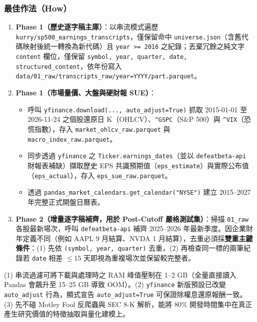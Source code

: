 \documentclass[11pt, a4paper]{article}
\begin{document}
\subsubsection{最佳作法（How）}
\begin{enumerate}[leftmargin=1.5em, itemsep=2pt]
    \item \textbf{Phase 1（歷史逐字稿主庫）}：以串流模式遍歷 \texttt{kurry/sp500\_earnings\_transcripts}，僅保留命中 \texttt{universe.json}（含舊代碼映射後統一轉換為新代碼）且 \texttt{year >= 2016} 之紀錄；丟棄冗餘之純文字 \texttt{content} 欄位，僅保留 \texttt{symbol, year, quarter, date, structured\_content}，依年份寫入 \texttt{data/01\_raw/transcripts\_raw/year=YYYY/part.parquet}。
    \item \textbf{Phase 1（市場量價、大盤與硬財報 SUE）}：
    \begin{itemize}[leftmargin=1.2em]
        \item 呼叫 \texttt{yfinance.download(..., auto\_adjust=True)} 抓取 2015-01-01 至 2026-11-24 之個股還原日 K（OHLCV）、\texttt{\^{}GSPC}（S\&P 500）與 \texttt{\^{}VIX}（恐慌指數），存入 \texttt{market\_ohlcv\_raw.parquet} 與 \texttt{macro\_index\_raw.parquet}。
        \item 同步透過 \texttt{yfinance} 之 \texttt{Ticker.earnings\_dates}（並以 \texttt{defeatbeta-api} 財報表補缺）擷取歷史 EPS 共識預期值（\texttt{eps\_estimate}）與實際公布值（\texttt{eps\_actual}），存入 \texttt{eps\_sue\_raw.parquet}。
        \item 透過 \texttt{pandas\_market\_calendars.get\_calendar("NYSE")} 建立 2015--2027 年完整正式開盤日曆表。
    \end{itemize}
    \item \textbf{Phase 2（增量逐字稿補齊，用於 Post-Cutoff 嚴格測試集）}：掃描 \texttt{01\_raw} 各股最新場次，呼叫 \texttt{defeatbeta-api} 補齊 2025--2026 年最新季度。因企業財年定義不同（例如 AAPL 9 月結算、NVDA 1 月結算），去重必須採\textbf{雙重主鍵條件}：(1) 先依 \texttt{(symbol, year, quarter)} 去重，(2) 再檢查同一標的兩筆紀錄若 \texttt{date} 相差 $\le 15$ 天即視為重複場次並保留較完整者。
\end{enumerate}

\begin{whybox}
(1) 串流過濾可將下載與處理時之 RAM 峰值壓制在 1--2 GB（全量直接讀入 Pandas 會飆升至 15--25 GB 導致 OOM）。(2) \texttt{yfinance} 新版預設已改變 \texttt{auto\_adjust} 行為，顯式宣告 \texttt{auto\_adjust=True} 可保證除權息還原報酬一致。(3) 先不碰 Motley Fool 反爬蟲與 SEC 8-K 解析，能將 80\% 開發時間集中在真正產生研究價值的特徵抽取與量化建模上。
\end{whybox}
\end{document}
